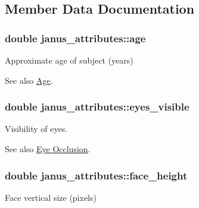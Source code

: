 \subsection{Member Data Documentation}
\hypertarget{structjanus__attributes_a01a94401c6d970bae36256bd601417dc}{}
\subsubsection[{age}]{\setlength{\rightskip}{0pt plus 5cm}double janus\+\_\+attributes\+::age}\label{structjanus__attributes_a01a94401c6d970bae36256bd601417dc}


Approximate age of subject (years) 

\begin{DoxySeeAlso}{See also}
\hyperlink{group__janus_age}{Age}. 
\end{DoxySeeAlso}
\hypertarget{structjanus__attributes_af667c27d0c5f5a8f4af9230367afdbbe}{}
\subsubsection[{eyes\+\_\+visible}]{\setlength{\rightskip}{0pt plus 5cm}double janus\+\_\+attributes\+::eyes\+\_\+visible}\label{structjanus__attributes_af667c27d0c5f5a8f4af9230367afdbbe}


Visibility of eyes. 

\begin{DoxySeeAlso}{See also}
\hyperlink{group__janus_eyes_visible}{Eye Occlusion}. 
\end{DoxySeeAlso}
\hypertarget{structjanus__attributes_ad372c599888c24f3105f3a6010d84cb0}{}
\subsubsection[{face\+\_\+height}]{\setlength{\rightskip}{0pt plus 5cm}double janus\+\_\+attributes\+::face\+\_\+height}\label{structjanus__attributes_ad372c599888c24f3105f3a6010d84cb0}


Face vertical size (pixels) 

